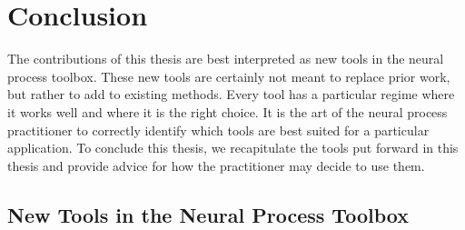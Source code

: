 \documentclass[12pt, twoside]{report}
\begin{document}
\chapter{Conclusion}
\label{chap:conclusion}

The contributions of this thesis are best interpreted as new tools in the neural process toolbox.
These new tools are certainly not meant to replace prior work, but rather to add to existing methods.
Every tool has a particular regime where it works well and where it is the right choice.
It is the art of the neural process practitioner to correctly identify which tools are best suited for a particular application.
To conclude this thesis, we recapitulate the tools put forward in this thesis and provide advice for how the practitioner may decide to use them.

\section{New Tools in the Neural Process Toolbox}
\end{document}
